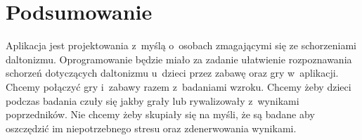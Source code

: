 \documentclass[12pt, letterpaper]{article}
\begin{document}
		\section{Podsumowanie}
		
		Aplikacja jest projektowania z~myślą o~osobach zmagającymi się ze schorzeniami daltonizmu. Oprogramowanie będzie miało za zadanie ułatwienie rozpoznawania schorzeń dotyczących daltonizmu u~dzieci przez zabawę oraz gry w~aplikacji. Chcemy połączyć gry i~zabawy razem z~badaniami wzroku. Chcemy żeby dzieci podczas badania czuły się jakby grały lub rywalizowały z~wynikami poprzedników. Nie chcemy żeby skupiały się na myśli, że są badane aby oszczędzić im niepotrzebnego stresu oraz zdenerwowania wynikami.
 
\end{document}
